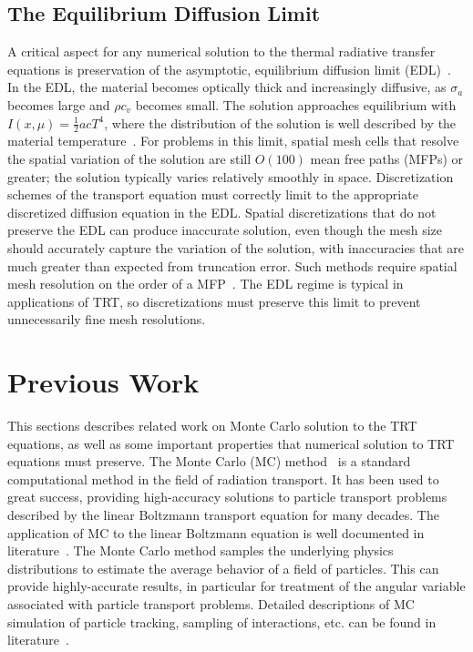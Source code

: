 \subsection{The Equilibrium Diffusion Limit}

A critical aspect for any numerical solution to the thermal radiative transfer equations
is preservation of the asymptotic, equilibrium diffusion limit (EDL)~\cite{morel_ldtrt,larsen_edl}.
In the EDL, the material becomes optically thick and increasingly diffusive, as $\sigma_a$ becomes large and
$\rho c_v$ becomes small.  The solution approaches equilibrium with $I(x,\mu)=\frac{1}{2}acT^4$,
where the distribution of the solution is well described by the material
temperature~\cite{larsen_edl}.  For problems in this limit, spatial mesh cells that resolve the spatial variation of the solution are
still $O(100)$ mean free paths (MFPs) or greater; the solution typically varies relatively smoothly in space.
Discretization schemes of the transport equation must correctly limit to the appropriate
discretized diffusion equation in the EDL.  Spatial discretizations that do not preserve
the EDL can produce inaccurate solution, even though the mesh size should accurately capture the variation of the solution, with
inaccuracies that are much greater than expected from truncation error.  Such methods
require spatial mesh resolution on the order of a MFP~\cite{morel_ldtrt}.  The EDL regime is typical in
applications of TRT, so discretizations must preserve this limit to prevent unnecessarily
fine mesh resolutions.

\section{Previous Work}

This sections describes related work on Monte Carlo solution to the TRT equations, as well
as some important properties that numerical solution to TRT equations must preserve.  
The Monte Carlo (MC) method~\cite{shultis_mc} is a standard computational method in
the field of radiation transport.  It has been used to great success, providing high-accuracy
solutions to particle
transport problems described by the linear Boltzmann transport equation for many decades.  The application of MC to the linear Boltzmann
equation is well documented in
literature~\cite{mcnp,shultis_mc,lewis}.  The Monte Carlo method samples the underlying physics distributions to estimate the
average behavior of a field of particles.  This can provide highly-accurate results, in
particular for treatment of the angular variable associated with particle transport
problems.  Detailed descriptions of MC simulation of particle tracking, sampling of
interactions, etc. can be found in literature~\cite{mcnp,wollaber_review,shultis_mc}.

